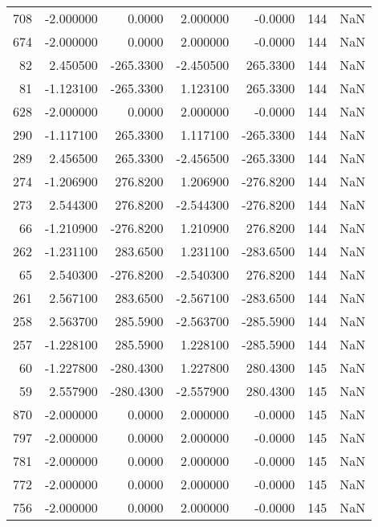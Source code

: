 \begin{tabular}{rrrrrrr}
 708 &   -2.000000 &    0.0000 &    2.000000 &     -0.0000 &         144 & NaN \\
 674 &   -2.000000 &    0.0000 &    2.000000 &     -0.0000 &         144 & NaN \\
  82 &    2.450500 & -265.3300 &   -2.450500 &    265.3300 &         144 & NaN \\
  81 &   -1.123100 & -265.3300 &    1.123100 &    265.3300 &         144 & NaN \\
 628 &   -2.000000 &    0.0000 &    2.000000 &     -0.0000 &         144 & NaN \\
 290 &   -1.117100 &  265.3300 &    1.117100 &   -265.3300 &         144 & NaN \\
 289 &    2.456500 &  265.3300 &   -2.456500 &   -265.3300 &         144 & NaN \\
 274 &   -1.206900 &  276.8200 &    1.206900 &   -276.8200 &         144 & NaN \\
 273 &    2.544300 &  276.8200 &   -2.544300 &   -276.8200 &         144 & NaN \\
  66 &   -1.210900 & -276.8200 &    1.210900 &    276.8200 &         144 & NaN \\
 262 &   -1.231100 &  283.6500 &    1.231100 &   -283.6500 &         144 & NaN \\
  65 &    2.540300 & -276.8200 &   -2.540300 &    276.8200 &         144 & NaN \\
 261 &    2.567100 &  283.6500 &   -2.567100 &   -283.6500 &         144 & NaN \\
 258 &    2.563700 &  285.5900 &   -2.563700 &   -285.5900 &         144 & NaN \\
 257 &   -1.228100 &  285.5900 &    1.228100 &   -285.5900 &         144 & NaN \\
  60 &   -1.227800 & -280.4300 &    1.227800 &    280.4300 &         145 & NaN \\
  59 &    2.557900 & -280.4300 &   -2.557900 &    280.4300 &         145 & NaN \\
 870 &   -2.000000 &    0.0000 &    2.000000 &     -0.0000 &         145 & NaN \\
 797 &   -2.000000 &    0.0000 &    2.000000 &     -0.0000 &         145 & NaN \\
 781 &   -2.000000 &    0.0000 &    2.000000 &     -0.0000 &         145 & NaN \\
 772 &   -2.000000 &    0.0000 &    2.000000 &     -0.0000 &         145 & NaN \\
 756 &   -2.000000 &    0.0000 &    2.000000 &     -0.0000 &         145 & NaN \\

\end{tabular}
